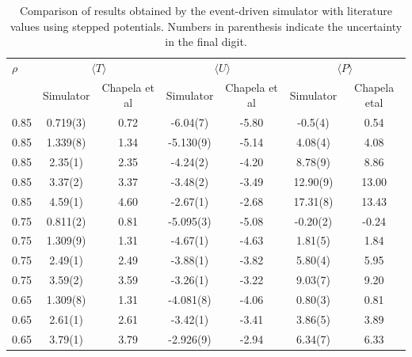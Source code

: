 \message{ !name(main.tex)}\documentclass[12pt]{UoAthesis}
\begin{document}
\begin{table} 
  \caption{Comparison of results
    obtained by the event-driven simulator with literature values
    using stepped potentials. Numbers in parenthesis indicate the
    uncertainty in the final digit.
\label{tab:benchsoft}} 
  \begin{center} 
    \begin{tabular}{l c c c c c c} 
      \toprule
      $\rho$ & \multicolumn{2}{c}{$\langle T\rangle$} &
      \multicolumn{2}{c}{$\langle U \rangle$} &
      \multicolumn{2}{c}{$\langle P \rangle$}
      \\ \cmidrule(rl{0.75em}){2-3} \cmidrule(rl{0.75em}){4-5}
      \cmidrule(rl{0.75em}){6-7}& Simulator & Chapela et al &
      Simulator & Chapela et al & Simulator & Chapela etal\\ 
      \midrule
      0.85 & 0.719(3) & 0.72 & -6.04(7) & -5.80 & -0.5(4) & 0.54
      \\ 0.85& 1.339(8) & 1.34 & -5.130(9) & -5.14 & 4.08(4) & 4.08
      \\ 0.85 & 2.35(1) & 2.35 & -4.24(2) & -4.20 & 8.78(9) & 8.86
      \\ 0.85 & 3.37(2) & 3.37 & -3.48(2) & -3.49 & 12.90(9) & 13.00
      \\ 0.85 & 4.59(1) & 4.60 & -2.67(1) & -2.68 & 17.31(8) & 13.43
      \\ 0.75 & 0.811(2) & 0.81 & -5.095(3) & -5.08 & -0.20(2) & -0.24
      \\ 0.75 &1.309(9) & 1.31 & -4.67(1) & -4.63 & 1.81(5) & 1.84
      \\ 0.75 & 2.49(1) & 2.49 & -3.88(1) & -3.82 & 5.80(4) & 5.95
      \\ 0.75 & 3.59(2) & 3.59 & -3.26(1) & -3.22 & 9.03(7) & 9.20
      \\ 0.65 & 1.309(8) & 1.31 & -4.081(8) & -4.06 & 0.80(3) & 0.81
      \\0.65 & 2.61(1) & 2.61 & -3.42(1) & -3.41 & 3.86(5) & 3.89
      \\ 0.65 & 3.79(1) & 3.79 & -2.926(9) & -2.94 & 6.34(7) & 6.33
      \\ 
      \bottomrule 
    \end{tabular}
\end{center} 
\end{table} 

\end{document}
